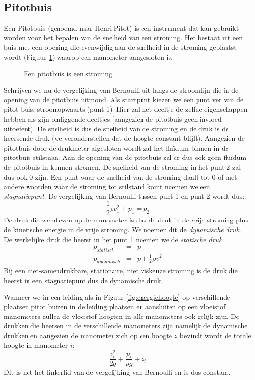 		\subsection{Pitotbuis}
Een Pitotbuis (genoemd naar Henri Pitot) is een instrument dat kan gebruikt worden voor het bepalen van de snelheid van een stroming. Het bestaat uit een buis met een opening die evenwijdig aan de snelheid in de stroming geplaatst wordt (Figuur \ref{fig:pitotbuis}) waarop een manometer aangesloten is.
\begin{figure}[htb]
	\centering
	
	\caption{Een pitotbuis is een stroming}
	\label{fig:pitotbuis}
\end{figure}
Schrijven we nu de vergelijking van Bernoulli uit langs de stroomlijn die in de opening van de pitotbuis uitmond. Als startpunt kiezen we een punt ver van de pitot buis, stroomopwaarts (punt 1). Hier zal het deeltje de zelfde eigenschappen hebben als zijn omliggende deeltjes (aangezien de pitotbuis geen invloed uitoefent). De snelheid is dus de snelheid van de stroming en de druk is de heersende druk (we veronderstellen dat de hoogte constant blijft). Aangezien de pitotbuis door de drukmeter afgesloten wordt zal het fluïdum binnen in de pitotbuis stilstaan. Aan de opening van de pitotbuis zal er dus ook geen fluïdum de pitotbuis in kunnen stromen. De snelheid van de stroming in het punt 2 zal dus ook 0 zijn. Een punt waar de snelheid van de stroming daalt tot 0 of met andere woorden waar de stroming tot stilstand komt noemen we een \emph{stagnatiepunt}. De vergelijking van Bernoulli tussen punt 1 en punt 2 wordt dus:
\begin{equation}
	\frac{1}{2} \rho v_1^2 + p_1 = p_2
\end{equation}
De druk die we aflezen op de manometer is dus de druk in de vrije stroming plus de kinetische energie in de vrije stroming. We noemen dit de \emph{dynamische druk}. De werkelijke druk die heerst in het punt 1 noemen we de \emph{statische druk}.
\begin{eqnarray}
	p_{statisch}  &=& p \\
	p_{dynamisch} &=& p + \frac{1}{2} \rho v^2
\end{eqnarray}
Bij een niet-samendrukbare, stationaire, niet viskeuze stroming is de druk die heerst in een stagnatiepunt dus de dynamische druk.

Wanneer we in een leiding als in Figuur \ref{fig:energiehoogte} op verschillende plaatsen pitot buizen in de leiding plaatsen en aansluiten op een vloeistof manometers zullen de vloeistof hoogten in alle manometers ook gelijk zijn. De drukken die heersen in de verschillende manometers zijn namelijk de dynamische drukken en aangezien de manometer zich op een hoogte $z$ bevindt wordt de totale hoogte in manometer $i$:
\begin{equation}
	\frac{v_i^2}{2 g} + \frac{p_i}{\rho g} + z_i
\end{equation}
Dit is net het linkerlid van de vergelijking van Bernoulli en is dus constant.


